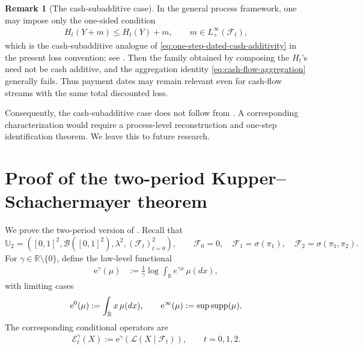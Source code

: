 \documentclass[a4paper]{amsart}
\theoremstyle{definition}
\newtheorem{remark}[remark]{Remark}
\newcommand{\R}{\mathbb{R}}
\newcommand{\F}{\mathcal{F}}
\newcommand{\supp}{\textup{supp}}
\newcommand{\law}{\mathcal{L}}
\begin{document}
\begin{remark}[The cash-subadditive case]
\label{rem:cash-flow-subadditive}
In the general process framework, one may impose only the one-sided condition
\begin{align}
H_t(Y+m)\le H_t(Y)+m,
\qquad m\in L^\infty_+(\F_t),
\label{eq:one-step-dated-cash-subadditivity}
\end{align}
which is the cash-subadditive analogue of
\eqref{eq:one-step-dated-cash-additivity} in the present loss convention; see
\cite{CheriditoKupper2011,AcciaioFollmerPenner2012}. Then the family obtained by
composing the \(H_t\)'s need not be cash additive, and the aggregation identity
\eqref{eq:cash-flow-aggregation} generally fails. Thus payment dates may remain
relevant even for cash-flow streams with the same total discounted loss.

Consequently, the cash-subadditive case does not follow from
. A corresponding characterization would require
a process-level reconstruction and one-step identification theorem. We leave this to future research. %
\end{remark}















\section{Proof of the two-period Kupper--Schachermayer theorem}
\label{sec:KS-two-period-proof}

We prove the two-period version of . %
Recall that
\[
\mathbb U_2
=
([0,1]^2,\mathcal B([0,1]^2),\lambda^2,(\F_t)_{t=0}^2),
\qquad
\F_0=0,\quad \F_1=\sigma(\pi_1),\quad \F_2=\sigma(\pi_1,\pi_2).
\]
For \(\gamma\in\R\setminus\{0\}\), define the law-level functional
\begin{align}
\mathrm e^\gamma(\mu)
&:=
\frac1\gamma\log\int_\R e^{\gamma x}\,\mu(dx),
\label{eq:KS-law-entropic}
\end{align}
with limiting cases
\begin{align}
\mathrm e^0(\mu):=\int_\R x\,\mu(dx),
\qquad
\mathrm e^\infty(\mu):=\sup\supp(\mu).
\label{eq:KS-law-entropic-limits}
\end{align}
The corresponding conditional operators are
\begin{align}
\mathcal E_t^\gamma(X)
:=
\mathrm e^\gamma(\law(X\mid\F_t)),
\qquad t=0,1,2.
\label{eq:KS-conditional-entropic}
\end{align}
\end{document}
